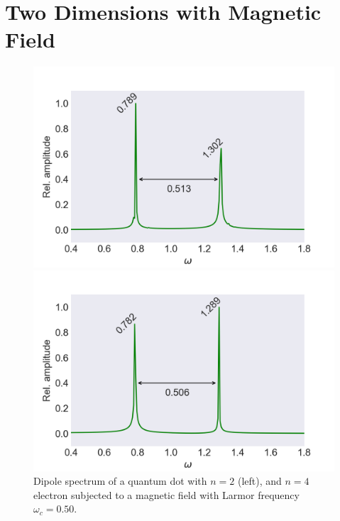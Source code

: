 \vfill
\pagebreak

\section{Two Dimensions with Magnetic Field}
\label{app:b_field}

\begin{figure}[!h]
    \centering
    \begin{minipage}{0.49\textwidth}
        \includegraphics[clip=2em 0em 10em 0em, width=\textwidth]
        {results/figures/B_field/n=2/b_spectrum_omc050.png}
    \end{minipage}\hfill 
    \begin{minipage}{0.49\textwidth}
        \includegraphics[clip=0em 0em 10em 0em, width=\textwidth]
        {results/figures/B_field/n=4/b_spectrum_n=4_omc=050.png}
    \end{minipage}
    \caption{Dipole spectrum of a quantum dot with $n=2$ (left), and $n=4$ electron 
    subjected to a magnetic field with Larmor frequency $\omega_c=0.50$.}
    \label{fig:b_omc050}
\end{figure}

